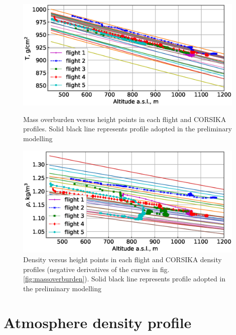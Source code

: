 \documentclass[final,5p,times,twocolumn]{elsarticle}
\begin{document}
\begin{figure}[bt]
\centering
\begin{minipage}[t]{0.48\textwidth}
\includegraphics[width=\textwidth]{figs/atmosphere_T.eps}
\vspace{-1.0pc}
\caption{Mass overburden versus height points in each flight and CORSIKA profiles. Solid black line represents profile adopted in the preliminary modelling}
\label{fig:massoverburden}
\end{minipage}
\vfill
\vspace{1pc}
\begin{minipage}[t]{0.48\textwidth}
\includegraphics[width=\textwidth]{figs/atmosphere_rho.eps}
\vspace{-1.0pc}
\caption{Density versus height points in each flight and CORSIKA density profiles (negative derivatives of the curves in fig. \ref{fig:massoverburden}). Solid black line represents profile adopted in the preliminary modelling}
\label{fig:density}
\end{minipage}
\end{figure}

\section{Atmosphere density profile\label{sect:atmosphere-profile}}
\end{document}
